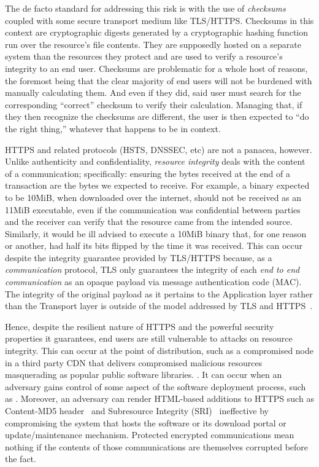 The de facto standard for addressing this risk is with the use of
\textit{checksums} coupled with some secure transport medium like TLS/HTTPS.
Checksums in this context are cryptographic digests generated by a cryptographic
hashing function run over the resource's file contents. They are supposedly
hosted on a separate system than the resources they protect and are used to
verify a resource’s integrity to an end user. Checksums are problematic for a
whole host of reasons, the foremost being that the clear majority of end users
will not be burdened with manually calculating them. And even if they did, said
user must search for the corresponding ``correct'' checksum to verify their
calculation. Managing that, if they then recognize the checksums are different,
the user is then expected to ``do the right thing,'' whatever that happens to be
in context.

HTTPS and related protocols (HSTS, DNSSEC, etc) are not a panacea, however.
Unlike authenticity and confidentiality, \textit{resource integrity} deals with
the content of a communication; specifically: ensuring the bytes received at the
end of a transaction are the bytes we expected to receive. For example, a binary
expected to be 10MiB, when downloaded over the internet, should not be received
as an 11MiB executable, even if the communication was confidential between
parties and the receiver can verify that the resource came from the intended
source. Similarly, it would be ill advised to execute a 10MiB binary that, for
one reason or another, had half its bits flipped by the time it was received.
This can occur despite the integrity guarantee provided by TLS/HTTPS because, as
a \textit{communication} protocol, TLS only guarantees the integrity of each
\textit{end to end communication} as an opaque payload via message
authentication code (MAC). The integrity of the original payload as it pertains
to the Application layer rather than the Transport layer is outside of the model
addressed by TLS and HTTPS~\cite{TLS1.2, HTTPS}.

Hence, despite the resilient nature of HTTPS and the powerful security
properties it guarantees, end users are still vulnerable to attacks on resource
integrity. This can occur at the point of distribution, such as a compromised
node in a third party CDN that delivers compromised malicious resources
masquerading as popular public software libraries. . It can occur when an adversary gains control of some
aspect of the software deployment process, such as . Moreover, an adversary can render HTML-based additions to HTTPS
such as Content-MD5 header~\cite{MD5Header} and Subresource Integrity
(SRI)~\cite{SRI} ineffective by compromising the system that hosts the software
or its download portal or update/maintenance mechanism. Protected encrypted
communications mean nothing if the contents of those communications are
themselves corrupted before the fact.

